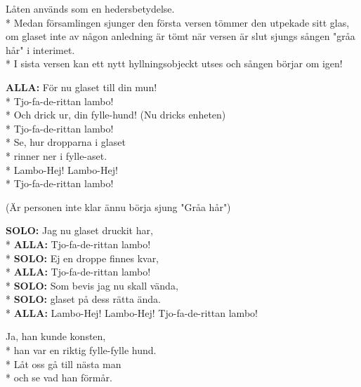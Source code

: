 \begin{SongText}[Lambo]
    \begin{SongInfo}
        Låten används som en hedersbetydelse.\\*%
        Medan församlingen sjunger den första versen tömmer den utpekade sitt glas, om glaset inte av någon anledning är tömt när versen är slut sjungs sången "gråa hår" i interimet.\\*%
        I sista versen kan ett nytt hyllningsobjeckt utses och sången börjar om igen!
    \end{SongInfo}
    \begin{SongVerse}
        \textbf{ALLA:} För nu glaset till din mun!\\*%
        Tjo-fa-de-rittan lambo!\\*%
        Och drick ur, din fylle-hund! (Nu dricks enheten)\\*%
        Tjo-fa-de-rittan lambo!\\*%
        Se, hur dropparna i glaset \\*%
        rinner ner i fylle-aset.\\*%
        Lambo-Hej! Lambo-Hej!\\*%
        Tjo-fa-de-rittan lambo!
    \end{SongVerse}
    \begin{SongVerse}
        (Är personen inte klar ännu börja sjung "Gråa hår")
    \end{SongVerse}
    \begin{SongVerse}
        \textbf{SOLO:} Jag nu glaset druckit har,\\*%
        \textbf{ALLA:} Tjo-fa-de-rittan lambo!\\*%
        \textbf{SOLO:} Ej en droppe finnes kvar,\\*%
        \textbf{ALLA:} Tjo-fa-de-rittan lambo!\\*%
        \textbf{SOLO:} Som bevis jag nu skall vända,\\*%
        \textbf{SOLO:} glaset på dess rätta ända.\\*%
        \textbf{ALLA:} Lambo-Hej! Lambo-Hej! Tjo-fa-de-rittan lambo!
    \end{SongVerse}
    \begin{SongVerse}
        Ja, han kunde konsten,\\*%
        han var en riktig fylle-fylle hund.\\*%
        Låt oss gå till nästa man\\*%
        och se vad han förmår.
    \end{SongVerse}
\end{SongText}
